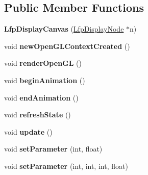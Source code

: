 \subsection*{Public Member Functions}
\begin{DoxyCompactItemize}
\item 
\hypertarget{classLfpDisplayCanvas_adf1ecfecb9a4230a1b5ae4207c89dc40}{{\bfseries Lfp\-Display\-Canvas} (\hyperlink{classLfpDisplayNode}{Lfp\-Display\-Node} $\ast$n)}\label{classLfpDisplayCanvas_adf1ecfecb9a4230a1b5ae4207c89dc40}

\item 
\hypertarget{classLfpDisplayCanvas_a10420b4c6af6726fb855c05fb15ccdea}{void {\bfseries new\-Open\-G\-L\-Context\-Created} ()}\label{classLfpDisplayCanvas_a10420b4c6af6726fb855c05fb15ccdea}

\item 
\hypertarget{classLfpDisplayCanvas_ac952d1aedbf1097aec5619a0bbaf671d}{void {\bfseries render\-Open\-G\-L} ()}\label{classLfpDisplayCanvas_ac952d1aedbf1097aec5619a0bbaf671d}

\item 
\hypertarget{classLfpDisplayCanvas_aae6334f1eeac3da5167dce9ae72b53a2}{void {\bfseries begin\-Animation} ()}\label{classLfpDisplayCanvas_aae6334f1eeac3da5167dce9ae72b53a2}

\item 
\hypertarget{classLfpDisplayCanvas_af670120f5fdcee9c1c340f30b99fcf38}{void {\bfseries end\-Animation} ()}\label{classLfpDisplayCanvas_af670120f5fdcee9c1c340f30b99fcf38}

\item 
\hypertarget{classLfpDisplayCanvas_a14309c7e69190c5f6a983c497495555b}{void {\bfseries refresh\-State} ()}\label{classLfpDisplayCanvas_a14309c7e69190c5f6a983c497495555b}

\item 
\hypertarget{classLfpDisplayCanvas_a0f600e6a270078464154341dffd7312a}{void {\bfseries update} ()}\label{classLfpDisplayCanvas_a0f600e6a270078464154341dffd7312a}

\item 
\hypertarget{classLfpDisplayCanvas_a89a984c9c289a1a542474a5d3619e377}{void {\bfseries set\-Parameter} (int, float)}\label{classLfpDisplayCanvas_a89a984c9c289a1a542474a5d3619e377}

\item 
\hypertarget{classLfpDisplayCanvas_a8eea063f9627611e3aa5ff09518b8bfe}{void {\bfseries set\-Parameter} (int, int, int, float)}\label{classLfpDisplayCanvas_a8eea063f9627611e3aa5ff09518b8bfe}

\end{DoxyCompactItemize}
